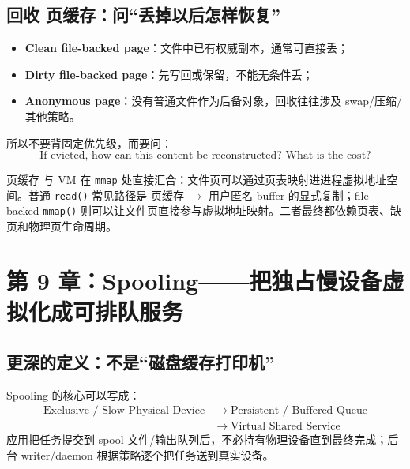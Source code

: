 \documentclass[11pt,a4paper]{ctexart}
\newcommand{\kw}[1]{\textbf{#1}}
\newcommand{\code}[1]{\texttt{#1}}
\newcommand{\arr}{\;\longrightarrow\;}
\begin{document}
\subsection{回收 页缓存：问“丢掉以后怎样恢复”}
\begin{itemize}
  \item \kw{Clean file-backed page}：文件中已有权威副本，通常可直接丢；
  \item \kw{Dirty file-backed page}：先写回或保留，不能无条件丢；
  \item \kw{Anonymous page}：没有普通文件作为后备对象，回收往往涉及 swap/压缩/其他策略。
\end{itemize}
所以不要背固定优先级，而要问：
\[
\boxed{\text{If evicted, how can this content be reconstructed? What is the cost?}}
\]

\begin{bridge}[与虚拟内存专题的接口]
页缓存 与 VM 在 \code{mmap} 处直接汇合：文件页可以通过页表映射进进程虚拟地址空间。普通 \code{read()} 常见路径是 页缓存 $\to$ 用户匿名 buffer 的显式复制；file-backed \code{mmap()} 则可以让文件页直接参与虚拟地址映射。二者最终都依赖页表、缺页和物理页生命周期。
\end{bridge}

\section{第 9 章：Spooling——把独占慢设备虚拟化成可排队服务}

\subsection{更深的定义：不是“磁盘缓存打印机”}
Spooling 的核心可以写成：
\[
\boxed{
\begin{aligned}
\text{Exclusive / Slow Physical Device}
&\arr
\text{Persistent / Buffered Queue}\\
&\arr
\text{Virtual Shared Service}
\end{aligned}
}
\]
应用把任务提交到 spool 文件/输出队列后，不必持有物理设备直到最终完成；后台 writer/daemon 根据策略逐个把任务送到真实设备。
\end{document}
